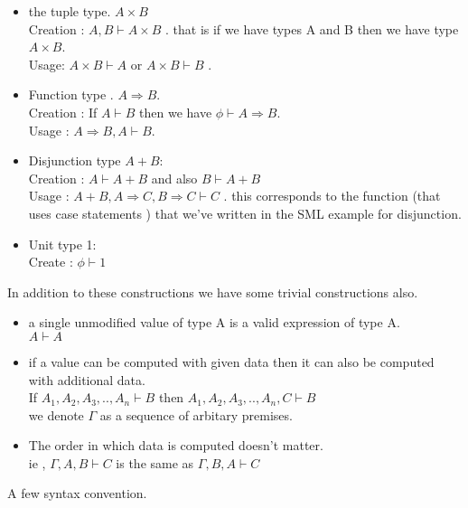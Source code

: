 \documentclass{article}
\begin{document}
\begin{itemize}

\item the tuple type. $ A \times B $\\
  Creation : $ A, B \vdash A \times B $ . that is if we have types A and B then we have type $ A \times B $.\\
  Usage: $ A \times B \vdash A $ or $ A \times B \vdash B $ .
\item Function type . $ A \Rightarrow B $.\\
  Creation : If $ A \vdash B$ then we have $ \phi \vdash A \Rightarrow B $.\\
  Usage : $ A \Rightarrow B , A \vdash B $.

\item Disjunction type $ A + B $:\\
  Creation : $ A \vdash A + B $ and also $ B \vdash A + B $\\
  Usage : $ A+B , A \Rightarrow C , B \Rightarrow C \vdash C $ . this corresponds to the function (that uses case statements )
  that we've written in   the SML example for disjunction.\\

\item Unit type 1:\\
  Create : $ \phi \vdash 1 $\\
    
\end{itemize}

In addition to these constructions we have some trivial constructions also.

\begin{itemize}
\item a single unmodified value of type A is a valid expression of type A.\\
  $ A \vdash A$
\item if a value can be computed with given data then it can also be computed with additional data.\\
  If $ A_1 , A_2 , A_3, .. , A_n \vdash B $ then $ A_1 , A_2 , A_3, .. , A_n , C \vdash B $\\
  we denote $ \Gamma $ as a sequence of arbitary premises.
\item The order in which data is computed doesn't matter. \\
  ie , $ \Gamma , A , B \vdash C $ is the same as $ \Gamma , B, A \vdash C$
\end{itemize}

A few syntax convention.
\end{document}
